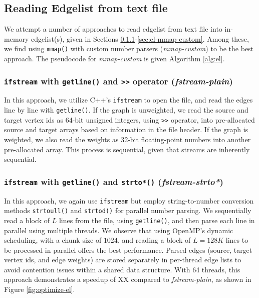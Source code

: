 \subsection{Reading Edgelist from text file}

We attempt a number of approaches to read edgelist from text file into in-memory edgelist(s), given in Sections \ref{sec:el-fstream-plain}-\ref{sec:el-mmap-custom}. Among these, we find using \texttt{mmap()} with custom number parsers (\textit{mmap-custom}) to be the best approach. The pseudocode for \textit{mmap-custom} is given Algorithm \ref{alg:el}.




\subsubsection{\texttt{ifstream} with \texttt{getline()} and \texttt{>>} operator (\textit{fstream-plain})}
\label{sec:el-fstream-plain}

In this approach, we utilize C++'s \texttt{ifstream} to open the file, and read the edges line by line with \texttt{getline()}. If the graph is unweighted, we read the source and target vertex ids as 64-bit unsigned integers, using \texttt{>>} operator, into pre-allocated source and target arrays based on information in the file header. If the graph is weighted, we also read the weights as 32-bit floating-point numbers into another pre-allocated array. This process is sequential, given that streams are inherently sequential.


\subsubsection{\texttt{ifstream} with \texttt{getline()} and \texttt{strto*()} (\textit{fstream-strto*})}
\label{sec:el-fstream-stro*}

In this approach, we again use \texttt{ifstream} but employ string-to-number conversion methods \texttt{strtoull()} and \texttt{strtod()} for parallel number parsing. We sequentially read a block of $L$ lines from the file, using \texttt{getline()}, and then parse each line in parallel using multiple threads. We observe that using OpenMP's dynamic scheduling, with a chunk size of $1024$, and reading a block of $L=128K$ lines to be processed in parallel offers the best performance. Parsed edges (source, target vertex ids, and edge weights) are stored separately in per-thread edge lists to avoid contention issues within a shared data structure. With 64 threads, this approach demonstrates a speedup of XX compared to \textit{fstream-plain}, as shown in Figure \ref{fig:optimize-el}.


